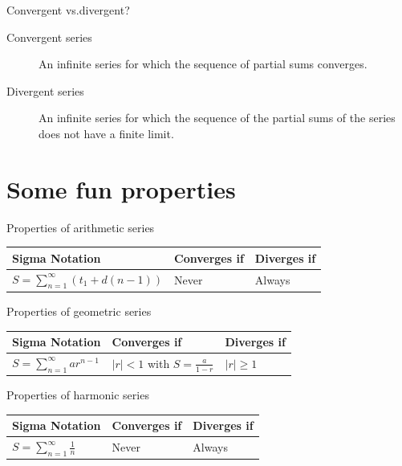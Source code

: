 	\begin{namedframe}{Convergent vs.\@ divergent?}
		\begin{description}
			\item[Convergent series] An infinite series for which the sequence of partial sums converges.
			\item[Divergent series] An infinite series for which the sequence of the partial sums of the series does not have a finite limit.
		\end{description}
	\end{namedframe}
	\section{Some fun properties}
	\begin{namedframe}{Properties of arithmetic series}
		\begin{center}
			\begin{tabular}{l|l|l}
				Sigma Notation                                       & Converges if & Diverges if \\\hline
				$S = \displaystyle\sum_{n=1}^{\infty}(t_1 + d(n-1))$ & Never        & Always
			\end{tabular}
		\end{center}
	\end{namedframe}
	\begin{namedframe}{Properties of geometric series}
		\begin{center}
			\begin{tabular}{l|l|l}
				Sigma Notation                                 & Converges if                       & Diverges if \\\hline
				$S = \displaystyle\sum_{n=1}^{\infty}ar^{n-1}$ & $|r| < 1$ with $S = \frac{a}{1-r}$ & $|r| \geq 1$
			\end{tabular}
		\end{center}
	\end{namedframe}
	\begin{namedframe}{Properties of harmonic series}
		\begin{center}
			\begin{tabular}{l|l|l}
				Sigma Notation                                    & Converges if & Diverges if \\\hline
				$S = \displaystyle\sum_{n=1}^{\infty}\frac{1}{n}$ & Never        & Always
			\end{tabular}
		\end{center}
	\end{namedframe}
